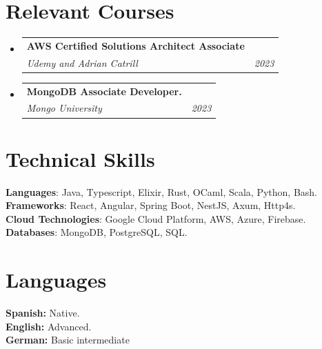 \documentclass[letterpaper,11pt]{article}
\makeatletter
\newcommand{\resumeSubheading}[4]{
  \vspace{-2pt}\item
    \begin{tabular*}{0.97\textwidth}[t]{l@{\extracolsep{\fill}}r}
      \textbf{#1} & #2 \\
      \textit{\small#3} & \textit{\small #4} \\
    \end{tabular*}\vspace{-7pt}
}
\newcommand{\resumeSubHeadingListStart}{\begin{itemize}[leftmargin=0.15in, label={}]}
\newcommand{\resumeSubHeadingListEnd}{\end{itemize}}
\makeatother
\begin{document}
%
\section{Relevant Courses}
  \resumeSubHeadingListStart
    \resumeSubheading
      {AWS Certified Solutions Architect Associate}{}
      {Udemy and Adrian Catrill}{2023}
    \resumeSubheading
      {MongoDB Associate Developer.}{}
      {Mongo University}{2023}
  \resumeSubHeadingListEnd

%
\section{Technical Skills}
 \begin{itemize}[leftmargin=0.15in, label={}]
    \small{\item{
     \textbf{Languages}{: Java, Typescript, Elixir, Rust, OCaml, Scala, Python, Bash.} \\
     \textbf{Frameworks}{: React, Angular, Spring Boot, NestJS, Axum, Http4s. } \\
     \textbf{Cloud Technologies}{: Google Cloud Platform, AWS, Azure, Firebase. } \\
     \textbf{Databases}{: MongoDB, PostgreSQL, SQL.} \\
    }}
 \end{itemize}

\section{Languages}
 \begin{itemize}[leftmargin=0.15in, label={}]
    \small{\item{
     \textbf{Spanish: }{Native.} \\
     \textbf{English: }{Advanced.} \\
     \textbf{German: }{Basic intermediate} \\
    }}
 \end{itemize}


\end{document}
